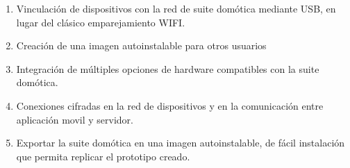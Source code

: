 \begin{enumerate}

  \item Vinculación de dispositivos con la red de suite domótica mediante USB, en lugar del clásico emparejamiento WIFI.

  \item Creación de una imagen autoinstalable para otros usuarios

  \item Integración de múltiples opciones de hardware compatibles con la suite domótica.

  \item Conexiones cifradas en la red de dispositivos y en la comunicación entre aplicación movil y servidor.

  \item Exportar la suite domótica en una imagen autoinstalable, de fácil instalación que permita replicar el prototipo creado.

\end{enumerate}
